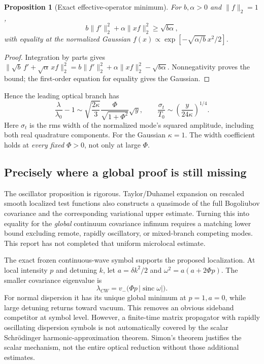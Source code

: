 \documentclass[11pt,a4paper]{article}
\newcommand{\sinc}{\operatorname{sinc}}
\newcommand{\lzero}{\lambda_0}
\newtheorem{proposition}{Proposition}
\begin{document}
\begin{proposition}[Exact effective-operator minimum]
For $b,\alpha>0$ and $\|f\|_2=1$,
\begin{equation}
b\|f'\|_2^2+\alpha\|xf\|_2^2\ge\sqrt{b\alpha},
\end{equation}
with equality at the normalized Gaussian $f(x)\propto\exp[-\sqrt{\alpha/b}\,x^2/2]$.
\end{proposition}
\begin{proof}
Integration by parts gives
$\|\sqrt b\,f'+\sqrt\alpha\,xf\|_2^2
=b\|f'\|_2^2+\alpha\|xf\|_2^2-\sqrt{b\alpha}$.
Nonnegativity proves the bound; the first-order equation for equality gives the Gaussian.
\end{proof}
Hence the leading optical branch has
\begin{equation}\label{eq:sqrtlaw}
\boxed{\frac{\lambda}{\lzero}-1
\sim\sqrt{\frac{2\kappa}{3}}\frac{\Phi}{\sqrt{1+\Phi^2}}\sqrt y,\qquad
\frac{\sigma_t}{T_0}\sim\left(\frac{y}{24\kappa}\right)^{1/4}.}
\end{equation}
Here $\sigma_t$ is the rms width of the normalized mode's squared amplitude, including both real quadrature components. For the Gaussian $\kappa=1$. The width coefficient holds at \emph{every fixed $\Phi>0$}, not only at large $\Phi$.

\subsection{Precisely where a global proof is still missing}

The oscillator proposition is rigorous. Taylor/Duhamel expansion on rescaled smooth localized test functions also constructs a quasimode of the full Bogoliubov covariance and the corresponding variational upper estimate. Turning this into equality for the \emph{global} continuum covariance infimum requires a matching lower bound excluding remote, rapidly oscillatory, or mixed-branch competing modes. This report has not completed that uniform microlocal estimate.

The exact frozen continuous-wave symbol supports the proposed localization. At local intensity $p$ and detuning $k$, let $a=\delta k^2/2$ and $\omega^2=a(a+2\Phi p)$. The smaller covariance eigenvalue is
\begin{equation}\label{eq:cwsymbol}
\lambda_{CW}=v_-\bigl(\Phi p\,|\sinc\omega|\bigr).
\end{equation}
For normal dispersion it has its unique global minimum at $p=1,a=0$, while large detuning returns toward vacuum. This removes an obvious sideband competitor at symbol level. However, a finite-time matrix propagator with rapidly oscillating dispersion symbols is not automatically covered by the scalar Schr\"odinger harmonic-approximation theorem. Simon's theorem \cite{simon} justifies the scalar mechanism, not the entire optical reduction without those additional estimates.
\end{document}
